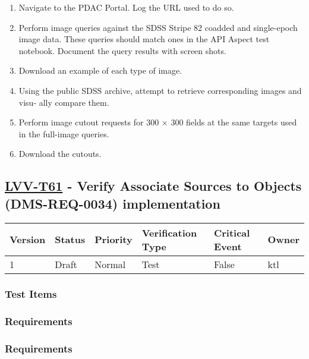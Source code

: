 \begin{enumerate}
\tightlist
\item
  Navigate to the PDAC Portal. Log the URL used to do so.
\item
  Perform image queries against the SDSS Stripe 82 coadded and
  single-epoch image data. These queries should match ones in the API
  Aspect test notebook. Document the query results with screen shots.
\item
  Download an example of each type of image.
\item
  Using the public SDSS archive, attempt to retrieve corresponding
  images and visu- ally compare them.
\item
  Perform image cutout requests for 300 × 300 fields at the same targets
  used in the full-image queries.
\item
  Download the cutouts.
\end{enumerate}

\hypertarget{lvv-t61---verify-associate-sources-to-objects-dms-req-0034-implementation}{%
\subsection{\texorpdfstring{\href{https://jira.lsstcorp.org/secure/Tests.jspa\#/testCase/LVV-T61}{LVV-T61}
- Verify Associate Sources to Objects (DMS-REQ-0034)
implementation}{LVV-T61 - Verify Associate Sources to Objects (DMS-REQ-0034) implementation}}\label{lvv-t61---verify-associate-sources-to-objects-dms-req-0034-implementation}}

\begin{longtable}[]{@{}llllll@{}}
\toprule
Version & Status & Priority & Verification Type & Critical Event &
Owner\tabularnewline
\midrule
\endhead
1 & Draft & Normal & Test & False & ktl\tabularnewline
\bottomrule
\end{longtable}

\hypertarget{test-items-2}{%
\subsubsection{Test Items}\label{test-items-2}}

\hypertarget{requirements-4}{%
\subsubsection{Requirements}\label{requirements-4}}

\hypertarget{requirements-5}{%
\subsubsection{Requirements}\label{requirements-5}}

